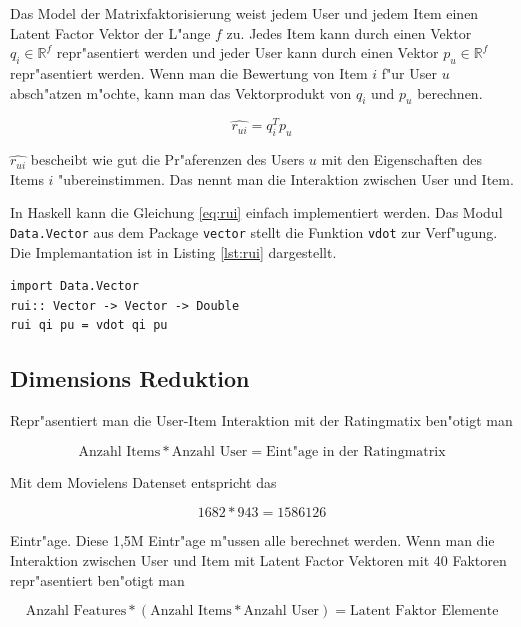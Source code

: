 \documentclass[a4paper, 12pt]{article}
\begin{document}
Das Model der Matrixfaktorisierung weist jedem User und jedem Item einen Latent Factor Vektor der L"ange $f$ zu. Jedes Item kann durch einen Vektor $q_i \in \mathbb{R}^f$ repr"asentiert werden und jeder User kann durch einen Vektor $p_u \in \mathbb{R}^f$ repr"asentiert werden. Wenn man die Bewertung von Item $i$ f"ur User $u$ absch"atzen m"ochte, kann man das Vektorprodukt von $q_i$ und $p_u$ berechnen.

\begin{equation}
  \label{eq:rui}
  \hat{r_{ui}} = q_i^T p_u
\end{equation}

$\hat{r_{ui}}$ bescheibt wie gut die Pr"aferenzen des Users $u$ mit den Eigenschaften des Items $i$ "ubereinstimmen. Das nennt man die Interaktion zwischen User und Item.

In Haskell kann die Gleichung \ref{eq:rui} einfach implementiert werden. Das Modul \verb|Data.Vector| aus dem Package \verb|vector| stellt die Funktion \verb|vdot| zur Verf"ugung. Die Implemantation ist in Listing \ref{lst:rui} dargestellt.

\begin{lstlisting}[caption=Implementation der Vorhersage, label=lst:rui]
import Data.Vector
rui:: Vector -> Vector -> Double
rui qi pu = vdot qi pu
\end{lstlisting}

\subsection{Dimensions Reduktion}
\label{sec:dimred}

Repr"asentiert man die User-Item Interaktion mit der Ratingmatix ben"otigt man 

\begin{equation}
  \label{eq:dimre1}
  \text{Anzahl Items} * \text{Anzahl User} = \text{Eint"age in der Ratingmatrix}
\end{equation}

Mit dem Movielens Datenset entspricht das

\begin{equation}
  \label{eq:dimre}
  1682 * 943 = 1586126
\end{equation}

Eintr"age. Diese 1,5M Eintr"age m"ussen alle berechnet werden. Wenn man die Interaktion zwischen User und Item mit Latent Factor Vektoren mit 40 Faktoren repr"asentiert ben"otigt man 

\begin{equation}
  \label{eq:dimred}
  \text{Anzahl Features}* (\text{Anzahl Items}*\text{Anzahl User}) = \text{Latent Faktor Elemente}
\end{equation}
\end{document}
